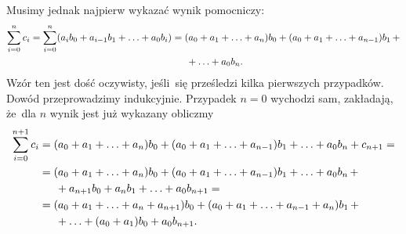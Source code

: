 \documentclass[a4paper,11pt]{article}
\begin{document}
Musimy jednak najpierw wykazać wynik pomocniczy:
\begin{equation}
  \label{eq:Leja-Funkcje-zespolone-22}
  \begin{split}
    \sum_{ i = 0 }^{ n } c_{ i } =
    \sum_{ i = 0 }^{ n } ( a_{ i } b_{ 0 } + a_{ i - 1 } b_{ 1 } + \ldots
    + a_{ 0 } b_{ i } )
    &= ( a_{ 0 } + a_{ 1 } + \ldots + a_{ n } ) b_{ 0 } + ( a_{ 0 } + a_{ 1 }
      + \ldots + a_{ n - 1 } ) b_{ 1 } \, + \\
    &\hspace{1.5em} + \ldots + a_{ 0 } b_{ n }.
  \end{split}
\end{equation}
Wzór ten jest dość oczywisty, jeśli~się prześledzi kilka pierwszych
przypadków. Dowód przeprowadzimy indukcyjnie. Przypadek $n = 0$
wychodzi sam, zakładają, że~dla $n$ wynik jest już wykazany obliczmy
\begin{equation}
  \label{eq:Leja-Funkcje-zespolone-23}
  \begin{split}
    \sum_{ i = 0 }^{ n + 1 } c_{ i }
    &= ( a_{ 0 } + a_{ 1 } + \ldots +
      a_{ n } ) b_{ 0 } + ( a_{ 0 } + a_{ 1 } + \ldots + a_{ n - 1 } )
      b_{ 1 } + \ldots + a_{ 0 } b_{ n } + c_{ n + 1 } = \\
    &= ( a_{ 0 } + a_{ 1 } + \ldots + a_{ n } ) b_{ 0 } + ( a_{ 0 } + a_{ 1 }
      + \ldots + a_{ n - 1 } ) b_{ 1 } + \ldots + a_{ 0 } b_{ n } \, + \\
    &\hspace{1.5em}
      + a_{ n + 1 } b_{ 0 } + a_{ n } b_{ 1 } + \ldots + a_{ 0 } b_{ n + 1 } = \\
    &= ( a_{ 0 } + a_{ 1 } + \ldots + a_{ n } + a_{ n + 1 } ) b_{ 0 } +
      ( a_{ 0 } + a_{ 1 } + \ldots + a_{ n - 1 } + a_{ n } ) b_{ 1 } \, + \\
    &\hspace{1.5em}
      + \ldots + ( a_{ 0 } + a_{ 1 } ) b_{ 0 } + a_{ 0 } b_{ n + 1 }.
  \end{split}
\end{equation}
\end{document}

